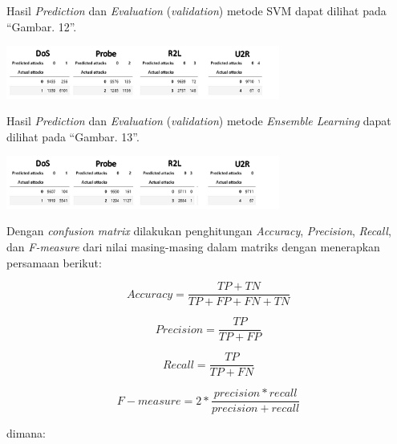 \documentclass[conference]{IEEEtran}
\begin{document}
Hasil \emph{Prediction} dan \emph{Evaluation} (\emph{validation})
metode SVM dapat dilihat
pada ``Gambar. 12''.

\begin{minipage}{\linewidth}
\centerline{\includegraphics[width=90mm]{Gambar/Gbr009.jpg}}
\label{fig12}
\end{minipage}
\vspace{6pt}

Hasil \emph{Prediction} dan \emph{Evaluation} (\emph{validation})
metode \emph{Ensemble Learning} dapat dilihat
pada ``Gambar. 13''.

\begin{minipage}{\linewidth}
\centerline{\includegraphics[width=90mm]{Gambar/Gbr010.jpg}}
\label{fig13}
\end{minipage}
\vspace{6pt}

Dengan \emph{confusion matrix} dilakukan penghitungan \emph{Accuracy}, \emph{Precision}, \emph{Recall},
dan \emph{F-measure} dari nilai masing-masing dalam matriks dengan menerapkan persamaan berikut:

\begin{equation*}
    Accuracy = \frac{TP + TN}{TP + FP + FN + TN}
    \label{eq6}
\end{equation*}

\begin{equation*}
    Precision = \frac{TP}{TP + FP}
    \label{eq7}
\end{equation*}

\begin{equation*}
    Recall = \frac{TP}{TP + FN}
    \label{eq8}
\end{equation*}

\begin{equation*}
    F-measure = 2 * \frac{precision * recall}{precision + recall}
    \label{eq9}
\end{equation*}

\noindent dimana:
\end{document}
